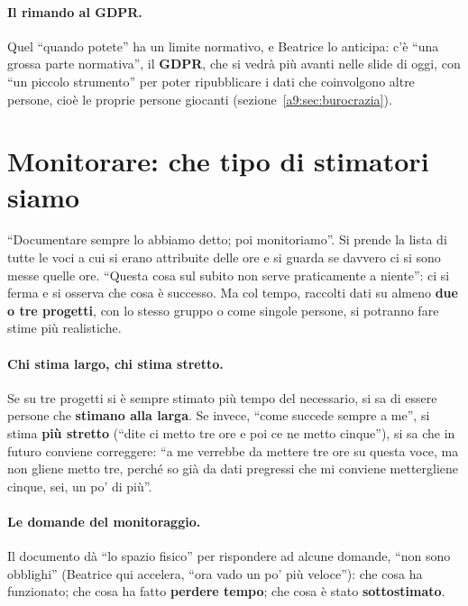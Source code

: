 \paragraph{Il rimando al GDPR.} Quel ``quando potete'' ha un limite normativo, e
Beatrice lo anticipa: c'è ``una grossa parte normativa'', il \textbf{GDPR}, che si
vedrà più avanti nelle slide di oggi, con ``un piccolo strumento'' per poter
ripubblicare i dati che coinvolgono altre persone, cioè le proprie persone giocanti
(sezione~\ref{a9:sec:burocrazia}).

\section{Monitorare: che tipo di stimatori siamo}
\label{a9:sec:monitoraggio}

``Documentare sempre lo abbiamo detto; poi monitoriamo''. Si prende la lista di tutte
le voci a cui si erano attribuite delle ore e si guarda se davvero ci si sono messe
quelle ore. ``Questa cosa sul subito non serve praticamente a niente'': ci si ferma e
si osserva che cosa è successo. Ma col tempo, raccolti dati su almeno \textbf{due o
tre progetti}, con lo stesso gruppo o come singole persone, si potranno fare stime più
realistiche.

\paragraph{Chi stima largo, chi stima stretto.} Se su tre progetti si è sempre
stimato più tempo del necessario, si sa di essere persone che \textbf{stimano alla
larga}. Se invece, ``come succede sempre a me'', si stima \textbf{più stretto} (``dite
ci metto tre ore e poi ce ne metto cinque''), si sa che in futuro conviene correggere:
``a me verrebbe da mettere tre ore su questa voce, ma non gliene metto tre, perché so
già da dati pregressi che mi conviene mettergliene cinque, sei, un po' di più''.

\paragraph{Le domande del monitoraggio.} Il documento dà ``lo spazio fisico'' per
rispondere ad alcune domande, ``non sono obblighi'' (Beatrice qui accelera, ``ora
vado un po' più veloce''): che cosa ha funzionato; che cosa ha fatto \textbf{perdere
tempo}; che cosa è stato \textbf{sottostimato}.

